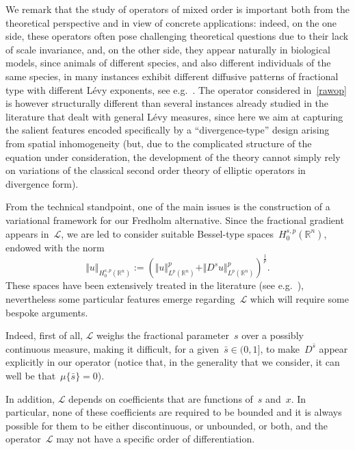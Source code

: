 \documentclass[11pt,hyp,]{nyjm}
\numberwithin{equation}{section}
\newcommand{\R}{\mathbb{R}}
\theoremstyle{remark}
\begin{document}
{W}e remark that the study of operators of mixed order is important both from the theoretical perspective and in view of concrete applications: indeed, on the one side, these operators often pose challenging theoretical questions due to their lack of scale invariance, and, on the other side, they appear naturally
in biological models, since animals of different species, and also different individuals of the same species,
in many instances exhibit different diffusive patterns of fractional type with different L\'evy exponents, see e.g.~\cite{MR4249816}.
The operator considered in~\eqref{rawop} is however structurally different than several instances already studied in the literature that dealt with general L\'evy measures, since
here we aim at capturing the salient features encoded specifically
by a ``divergence-type'' design arising from spatial inhomogeneity (but, due to the complicated 
structure of the equation under consideration, the development of the theory cannot simply rely on variations of
the classical second order theory of elliptic operators in divergence form).

{F}rom the technical standpoint, one of the main issues is
the construction of a variational framework for our Fredholm alternative.
Since the fractional gradient appears in~$\mathcal{L}$, we are led to consider suitable Bessel-type spaces~$H_0^{s,p}(\R^n)$, endowed with the norm
\begin{equation*}
 \Vert u \Vert_{H_0^{s,p}(\R^n)}:=\left( \Vert  u \Vert^p_{L^p(\R^n)}+ \Vert D^s u \Vert^p_{L^p(\R^n)}\right)^{\frac1p} .
\end{equation*}
These spaces have been extensively treated in the literature (see e.g.~\cite{shieh, comi, piola}),
nevertheless some particular features emerge regarding~$\mathcal{L}$ which will require some bespoke arguments.

Indeed, first of all, $\mathcal{L}$ weighs the fractional parameter~$s$ over a possibly continuous measure, making it difficult, for a given~$\bar{s} \in (0,1]$, to make~$D^{\bar{s}}$ appear explicitly in our operator
(notice that, in the generality that we consider, it can well be that~$\mu\{ \bar{s} \}=0$).

In addition, $\mathcal{L}$ depends on coefficients that are functions of~$s$ and~$x$. In particular, none of these coefficients are required to be bounded and it is always possible for them to be either discontinuous, or unbounded, or both, and the operator~$\mathcal{L}$ may not have a specific order of differentiation.
\end{document}

